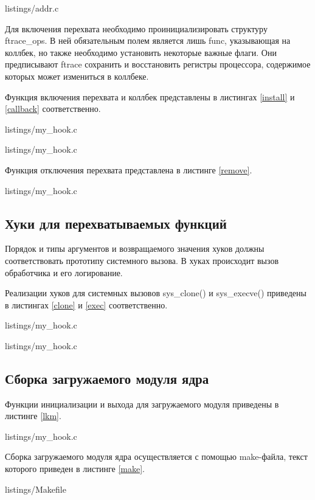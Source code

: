 
{listings/addr.c}

Для включения перехвата необходимо проинициализировать структуру ftrace\_ops. В ней обязательным полем является лишь func, указывающая на коллбек, но также необходимо установить некоторые важные флаги. Они предписывают ftrace сохранить и восстановить регистры процессора, содержимое которых может измениться в коллбеке.

Функция включения перехвата и коллбек представлены в листингах \ref{install} и \ref{callback} соответственно.


{listings/my_hook.c}


{listings/my_hook.c}

Функция отключения перехвата представлена в листинге \ref{remove}.


{listings/my_hook.c}

\subsection{Хуки для перехватываемых функций}

Порядок и типы аргументов и возвращаемого значения хуков должны соответствовать прототипу системного вызова. В хуках происходит вызов обработчика и его логирование.

Реализации хуков для системных вызовов sys\_clone() и sys\_execve() приведены в листингах \ref{clone} и \ref{exec} соответственно.


{listings/my_hook.c}


{listings/my_hook.c}

\pagebreak

\subsection{Сборка загружаемого модуля ядра}

Функции инициализации и выхода для загружаемого модуля приведены в листинге \ref{lkm}.


{listings/my_hook.c}

Сборка загружаемого модуля ядра осуществляется с помощью make-файла, текст которого приведен в листинге \ref{make}.


{listings/Makefile}

\pagebreak